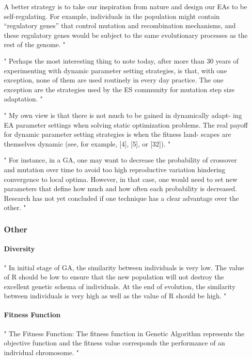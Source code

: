 A better strategy is to take our inspiration from nature and design our EAs to be self-regulating. For example, individuals in the population might contain “regulatory genes” that control mutation and recombination mechanisms, and these regulatory genes would be subject to the same evolutionary processes as the rest of the genome.
"\cite{kacprzyk_parameter_2007}

"
Perhaps the most interesting thing to note today, after more than 30 years of experimenting with dynamic parameter setting strategies, is that, with one exception, none of them are used routinely in every day practice. The one exception are the strategies used by the ES community for mutation step size adaptation.
"\cite{kacprzyk_parameter_2007}

"
My own view is that there is not much to be gained in dynamically adapt- ing EA parameter settings when solving static optimization problems. The real payoff for dynamic parameter setting strategies is when the fitness land- scapes are themselves dynamic (see, for example, [4], [5], or [32]).
"\cite{kacprzyk_parameter_2007}

"
For instance, in a GA, one may want to decrease the probability of crossover and mutation over time to avoid too high reproductive variation hindering convergence to local optima. However, in that case, one would need to set new parameters that define how much and how often each probability is decreased. Research has not yet concluded if one technique has a clear advantage over the other.
"\cite{klampfl_using_nodate}

\subsubsection{Other}
\paragraph{Diversity}
"
In initial stage of GA, the similarity between individuals is very low. The value of R should be low to ensure that the new population will not destroy the excellent genetic schema of individuals. At the end of evolution, the similarity between individuals is very high as well as the value of R should be high.
"\cite{katoch_review_2021}


\paragraph{Fitness Function}
"
The Fitness Function: The fitness function in Genetic Algorithm represents the objective function and the fitness value corresponds the performance of an individual chromosome.
"\cite{majumdar_genetic_2015}


